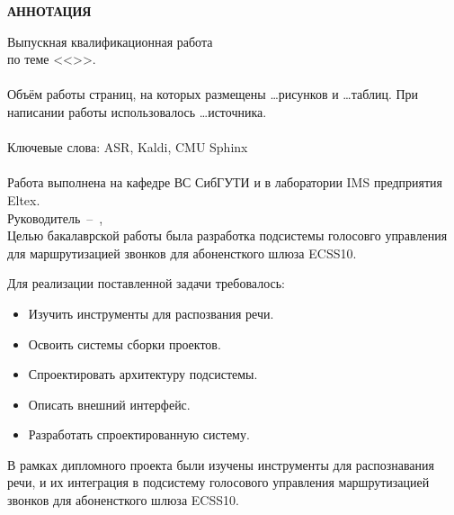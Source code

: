 \begin{center}
    \bf
    АННОТАЦИЯ
\end{center}


Выпускная квалификационная работа \fioa \\
по теме <<\topicname>>.\\
\hfill \\
Объём работы \pageref{LastPage} страниц, на которых размещены \dots рисунков
и \dots таблиц. При написании работы использовалось \dots источника. \\
\hfill \\
Ключевые слова: ASR, Kaldi, CMU Sphinx \\
\hfill \\
Работа выполнена на кафедре ВС СибГУТИ и в лаборатории IMS предприятия Eltex. \\
Руководитель~--~\thead, \\


Целью бакалаврской работы была разработка подсистемы голосовго управления
для маршрутизацией звонков для абоненсткого шлюза ECSS10.


Для реализации поставленной задачи требовалось:

\begin{itemize}
    \item Изучить инструменты для распозвания речи.
    \item Освоить системы сборки проектов.
    \item Спроектировать архитектуру подсистемы.
    \item Описать внешний интерфейс.
    \item Разработать спроектированную систему.
\end{itemize}


В рамках дипломного проекта были изучены инструменты для распознавания речи, и
их интеграция в подсистему голосового управления маршрутизацией звонков для
абоненсткого шлюза ECSS10.


\thispagestyle{empty}
\newpage
